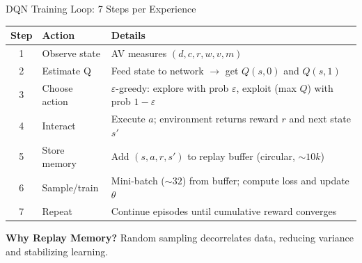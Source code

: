 \documentclass{beamer}
\begin{document}
\begin{frame}{DQN Training Loop: 7 Steps per Experience}
  \scriptsize
  \begin{tabular}{|c|p{1.8cm}|p{4.4cm}|}
    \hline
    \textbf{Step} & \textbf{Action} & \textbf{Details} \\
    \hline
    1 & Observe state & AV measures $(d, c, r, w, v, m)$ \\
    \hline
    2 & Estimate Q & Feed state to network $\to$ get $Q(s, 0)$ and $Q(s, 1)$ \\
    \hline
    3 & Choose action & $\varepsilon$-greedy: explore with prob $\varepsilon$, exploit (max $Q$) with prob $1-\varepsilon$ \\
    \hline
    4 & Interact & Execute $a$; environment returns reward $r$ and next state $s'$ \\
    \hline
    5 & Store memory & Add $(s, a, r, s')$ to replay buffer (circular, $\sim 10k$) \\
    \hline
    6 & Sample/train & Mini-batch ($\sim 32$) from buffer; compute loss and update $\theta$ \\
    \hline
    7 & Repeat & Continue episodes until cumulative reward converges \\
    \hline
  \end{tabular}

  \vspace{0.08cm}
  \footnotesize\textbf{Why Replay Memory?} Random sampling decorrelates data, reducing variance and stabilizing learning.

  \normalsize
\end{frame}
\end{document}
